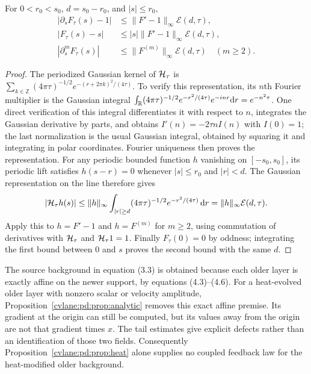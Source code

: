 \begin{cvlanepdproposition}\label{cvlane:pd:prop:tail}
For $0<r_0<s_0$, $d=s_0-r_0$, and $|s|\leq r_0$,
\begin{align}
 |\partial_sF_\tau(s)-1|&\leq\|F'-1\|_\infty\mathcal E(d,\tau),\label{cvlane:pd:eq:tail1}\\
 |F_\tau(s)-s|&\leq |s|\|F'-1\|_\infty\mathcal E(d,\tau),\label{cvlane:pd:eq:tail0}\\
 |\partial_s^mF_\tau(s)|&\leq\|F^{(m)}\|_\infty\mathcal E(d,\tau)
   \quad(m\geq2).\label{cvlane:pd:eq:tailm}
\end{align}
\end{cvlanepdproposition}
\begin{proof}
The periodized Gaussian kernel of $\mathcal H_\tau$ is
$\sum_{k\in\mathbb Z}(4\pi\tau)^{-1/2}
e^{-(r+2\pi k)^2/(4\tau)}$. To verify this representation, its $n$th
Fourier multiplier is the Gaussian integral
$\int_{\mathbb R}(4\pi\tau)^{-1/2}e^{-r^2/(4\tau)}e^{-inr}\mathrm d r=e^{-n^2\tau}$.
One direct verification of this integral differentiates it with respect
to $n$, integrates the Gaussian derivative by parts, and obtains
$I'(n)=-2\tau n I(n)$ with $I(0)=1$; the last normalization is the usual
Gaussian integral, obtained by squaring it and integrating in polar
coordinates. Fourier uniqueness then proves the representation.
For any periodic bounded function $h$ vanishing on $[-s_0,s_0]$, its
periodic lift satisfies $h(s-r)=0$ whenever $|s|\leq r_0$ and $|r|<d$.
The Gaussian representation on the line therefore gives
\[
 |\mathcal H_\tau h(s)|\leq
 \|h\|_\infty\int_{|r|\geq d}
 (4\pi\tau)^{-1/2}e^{-r^2/(4\tau)}\,\mathrm d r
 =\|h\|_\infty\mathcal E(d,\tau).
\]
Apply this to $h=F'-1$ and $h=F^{(m)}$ for $m\geq2$, using commutation
of derivatives with $\mathcal H_\tau$ and $\mathcal H_\tau1=1$.
Finally $F_\tau(0)=0$ by oddness; integrating the first bound between
$0$ and $s$ proves the second bound with the same $d$.
\end{proof}

The source background in equation (3.3) is obtained because each older
layer is exactly affine on the newer support, by equations (4.3)--(4.6).
For a heat-evolved older layer with nonzero scalar or velocity amplitude,
Proposition~\ref{cvlane:pd:prop:analytic} removes this exact affine premise.
Its gradient at the origin can still be computed, but its values away
from the origin are not that gradient times $x$. The tail estimates give
explicit defects rather than an identification of those two fields.
Consequently Proposition~\ref{cvlane:pd:prop:heat} alone supplies no coupled feedback
law for the heat-modified older background.

